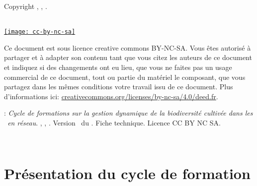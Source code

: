 \normalsize

\vfill

\begin{center}
Copyright \RSP, \INRA, \ITAB.

~\\

\href{http://creativecommons.org/licenses/by-nc-sa/4.0/deed.fr}{\texttt{[image: cc-by-nc-sa]}}
\end{center}

\small
Ce document est sous licence creative commons BY-NC-SA.
Vous êtes autorisé à partager et à adapter son contenu tant 
que vous citez les auteurs de ce document et indiquez si des changements ont eu lieu, 
que vous ne faites pas un usage commercial de ce document, tout ou partie du matériel le composant,
que vous partagez dans les mêmes conditions votre travail issu de ce document. 
Plus d'informations ici: \url{creativecommons.org/licenses/by-nc-sa/4.0/deed.fr}.

\vfill

:
\textit{
Cycle de formations sur la gestion dynamique de la biodiversité cultivée dans les
\MSPs~en réseau}.
\RSP, \INRA, \ITAB.
Version \versionCF~du \dateversionCF.
Fiche technique.
Licence CC BY NC SA.


\newpage ~\\ \newpage \tableofcontents \newpage \pagestyle{plain}

\chapter{Présentation du cycle de formation}
\startcontents[chapters]









%
% 
% 
%
%
%
%
%
% 
%
% 
% 
% 

